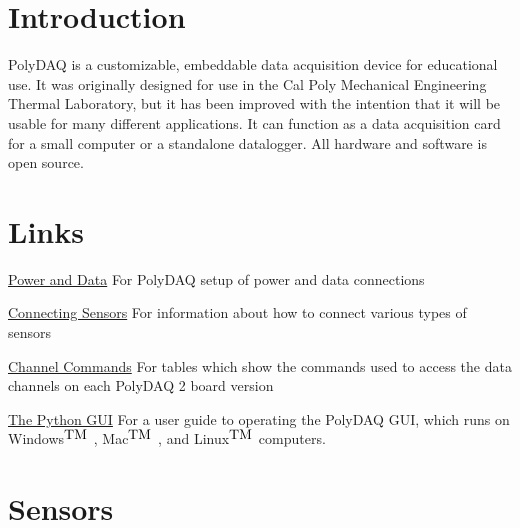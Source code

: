 \hypertarget{index_Introduction}{}\section{Introduction}\label{index_Introduction}
Poly\-D\-A\-Q is a customizable, embeddable data acquisition device for educational use. It was originally designed for use in the Cal Poly Mechanical Engineering Thermal Laboratory, but it has been improved with the intention that it will be usable for many different applications. It can function as a data acquisition card for a small computer or a standalone datalogger. All hardware and software is open source.\hypertarget{index_Links}{}\section{Links}\label{index_Links}
\begin{DoxyItemize}
\item \hyperlink{pd_setup}{Power and Data} For Poly\-D\-A\-Q setup of power and data connections \item \hyperlink{pd_sensors}{Connecting Sensors} For information about how to connect various types of sensors \item \hyperlink{pd_channels}{Channel Commands} For tables which show the commands used to access the data channels on each Poly\-D\-A\-Q 2 board version \item \hyperlink{pd_py_gui}{The Python G\-U\-I} For a user guide to operating the Poly\-D\-A\-Q G\-U\-I, which runs on Windows$^{\mbox{T\-M}}$ , Mac$^{\mbox{T\-M}}$ , and Linux$^{\mbox{T\-M}}$  computers.\end{DoxyItemize}
\hypertarget{index_Sensors}{}\section{Sensors}\label{index_Sensors}
